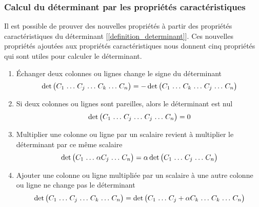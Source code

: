 \subsubsection{Calcul du déterminant par les propriétés caractéristiques}
Il est possible de prouver des nouvelles propriétés à partir des propriétés caractéristiques du déterminant [\ref{definition_determinant}]. Ces nouvelles propriétés ajoutées aux propriétés caractéristiques nous donnent cinq propriétés qui sont utiles pour calculer le déterminant.
\begin{enumerate}
    \item Échanger deux colonnes ou lignes change le signe du déterminant
          \[\det \arraycolsep=0.3\arraycolsep \begin{pmatrix}
                  C_1 & \ldots & C_j & \ldots & C_k & \ldots & C_n
              \end{pmatrix} = -\det \begin{pmatrix}
                  C_1 & \ldots & C_k & \ldots & C_j & \ldots & C_n
              \end{pmatrix}\]
    \item Si deux colonnes ou lignes sont pareilles, alors le déterminant est nul
          \[\det \arraycolsep=0.3\arraycolsep \begin{pmatrix}
                  C_1 & \ldots & C_j & \ldots & C_j & \ldots & C_n
              \end{pmatrix} = 0\]
    \item Multiplier une colonne ou ligne par un scalaire revient à multiplier le déterminant par ce même scalaire
          \[\det \arraycolsep=0.3\arraycolsep \begin{pmatrix}
                  C_1 & \ldots & \alpha C_j & \ldots & C_n
              \end{pmatrix} = \alpha \det \begin{pmatrix}
                  C_1 & \ldots & C_j & \ldots & C_n
              \end{pmatrix}\]
    \item Ajouter une colonne ou ligne multipliée par un scalaire à une autre colonne ou ligne
          ne change pas le déterminant
          \[ \det \arraycolsep=0.3\arraycolsep \begin{pmatrix}
                  C_1 & \ldots & C_j & \ldots & C_k & \ldots & C_n
              \end{pmatrix} = \det \begin{pmatrix}
                  C_1 & \ldots & C_j + \alpha C_k & \ldots & C_k & \ldots & C_n

\end{pmatrix}\]
\end{enumerate}
